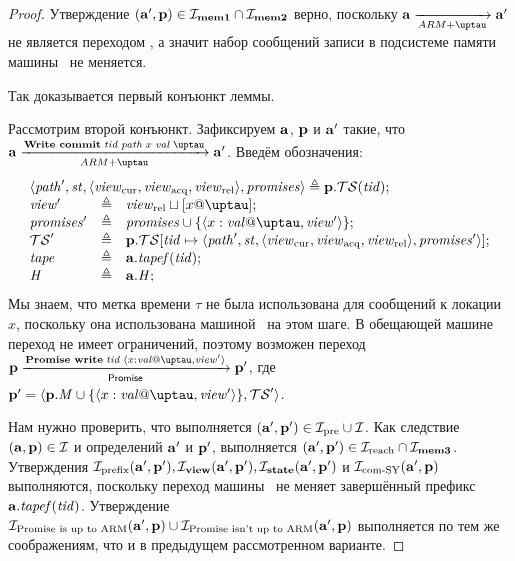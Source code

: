 \begin{proof}
  Утверждение $(\mathbf{a}', \mathbf{p}) \in \mathcal{I}_{\rm \bf mem1} \cap \mathcal{I}_{\rm \bf mem2}$ верно, поскольку $\aT \armStepgen{} \aT'$ не
  является переходом , а значит набор сообщений записи в подсистеме памяти машины \ARMt~не меняется.
  
  Так доказывается первый конъюнкт леммы.
  
  Рассмотрим второй конъюнкт.
  Зафиксируем $\mathbf{a}$, $\mathbf{p}$ и $\mathbf{a}'$ такие, что $\aT \armStepWriteCommit \aT'$.
  Введём обозначения:
\[
\begin{array}{l l l}
\multicolumn{3}{l}{\angled{\cpath', \PromState, \angled{\Rcur, \Racq, \Rrel}, \PromSet} \triangleq \p.\TSfprom(\tId);}\\
\R' & \triangleq & \Rrel \sqcup [x @ \tau]; \\
\PromSet' & \triangleq & \PromSet \cup \{\writeEvt{x}{\stval}{\tau}{\R'}\}; \\
\TSfprom' & \triangleq & \p.\TSfprom[\tId \mapsto \angled{\cpath', \PromState, \angled{\Rcur, \Racq, \Rrel}, \PromSet'}]; \\
\tape     & \triangleq & \aT.\tapef(\tId); \\
\hmap     & \triangleq & \aT.\hmap; \\
\end{array}
\]
Мы знаем, что метка времени $\tau$ не была использована для сообщений к локации $x$,
поскольку она использована машиной \ARMt~на этом шаге.
В обещающей машине переход  не имеет ограничений,
поэтому возможен переход $\p \promStepPromiseRPrime \p'$,
где $\p' = \angled{\p.\Mprom \cup \{\writeEvt{x}{\stval}{\tau}{\R'}\}, \TSfprom'}$.

Нам нужно проверить, что выполняется $(\mathbf{a}', \mathbf{p}') \in \mathcal{I}_{\textup{\rm pre}} \cup \mathcal{I}$.
Как следствие $(\mathbf{a}, \mathbf{p}) \in \mathcal{I}$ и определений $\mathbf{a}'$ и $\mathbf{p}'$, выполняется $(\mathbf{a}', \mathbf{p}') \in \mathcal{I}_{\textup{\rm reach}} \cap \mathcal{I}_{\rm \bf mem3}$.
Утверждения $\mathcal{I}_{\textup{\rm prefix}}(\mathbf{a}', \mathbf{p}'), \mathcal{I}_{\rm \bf view}(\mathbf{a}', \mathbf{p}'), \mathcal{I}_{\rm \bf state}(\mathbf{a}', \mathbf{p}')$ и $\mathcal{I}_{\textup{\rm com-SY}}(\mathbf{a}', \mathbf{p})$ выполняются,
поскольку переход  машины \ARMt~не меняет завершённый префикс $\mathbf{a}.\mathit{tapef}(\mathit{tid})$.
Утверждение $\mathcal{I}_{\textup{\rm Promise is up to ARM}}(\mathbf{a}', \mathbf{p}) \cup \mathcal{I}_{\textup{\rm Promise isn't up to ARM}}(\mathbf{a}', \mathbf{p})$ выполняется по тем же соображениям, что
и в предыдущем рассмотренном варианте.


\end{proof}
